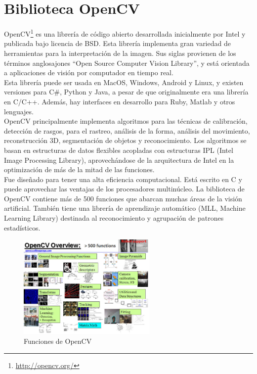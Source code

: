 \section{Biblioteca OpenCV}
OpenCV\footnote{\url{http://opencv.org/}} es una librería de código abierto desarrollada inicialmente por Intel y publicada bajo licencia de BSD. Esta librería implementa gran variedad de herramientas para la interpretación de la imagen. Sus siglas provienen de los términos anglosajones ``Open Source Computer Vision Library'', y está orientada a aplicaciones de visión por computador en tiempo real.  \\

Esta librería puede ser usada en MacOS, Windows, Android y Linux, y existen versiones para C\#, Python y Java, a pesar de que originalmente era una librería en C/C++. Además, hay interfaces en desarrollo para Ruby, Matlab y otros lenguajes.\\

OpenCV principalmente implementa algoritmos para las técnicas de calibración, detección de rasgos, para el rastreo, análisis de la forma, análisis del movimiento, reconstrucción 3D, segmentación de objetos y reconocimiento. Los algoritmos se basan en estructuras de datos flexibles acopladas con estructuras IPL (Intel Image Processing Library), aprovechándose de la arquitectura de Intel en la optimización de más de la mitad de las funciones.  \\

Fue diseñado para tener una alta eficiencia computacional. Está escrito en C y puede aprovechar las ventajas de los procesadores multinúcleo. La biblioteca de OpenCV contiene más de 500 funciones que abarcan muchas áreas de la visión artificial. También tiene una librería de aprendizaje automático (MLL, Machine Learning Library) destinada al reconocimiento y agrupación de patrones estadísticos. 

\begin{figure}[H]
  \begin{center}
    \includegraphics[width=0.6\textwidth]{figures/Infraestructura/opencv.png}
		\caption{Funciones de OpenCV }
		\label{fig.opencv}
		\end{center}
\end{figure}

